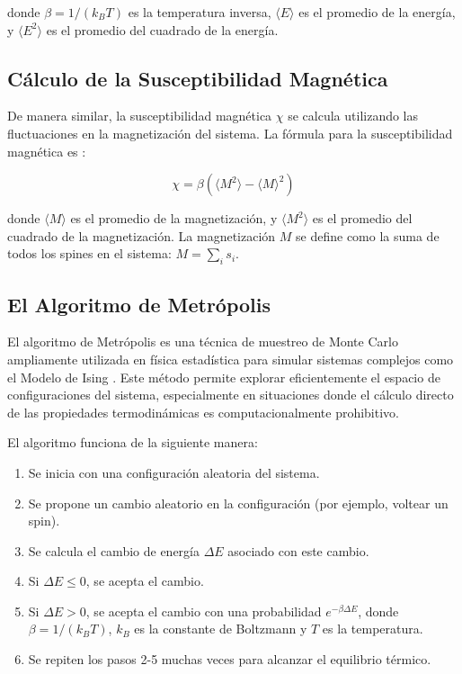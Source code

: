 \documentclass[twocolumn]{article}
\begin{document}
donde $\beta = 1/(k_B T)$ es la temperatura inversa, $\langle E \rangle$ es el promedio de la energía, y $\langle E^2 \rangle$ es el promedio del cuadrado de la energía. 

\subsection*{Cálculo de la Susceptibilidad Magnética}

De manera similar, la susceptibilidad magnética $\chi$ se calcula utilizando las fluctuaciones en la magnetización del sistema. La fórmula para la susceptibilidad magnética es \cite{chang_fisica_computacional}:

\begin{equation}
    \chi = \beta (\langle M^2 \rangle - \langle M \rangle^2)
\end{equation}

donde $\langle M \rangle$ es el promedio de la magnetización, y $\langle M^2 \rangle$ es el promedio del cuadrado de la magnetización. La magnetización $M$ se define como la suma de todos los spines en el sistema: $M = \sum_i s_i$.

\subsection*{El Algoritmo de Metrópolis}

El algoritmo de Metrópolis es una técnica de muestreo de Monte Carlo ampliamente utilizada en física estadística para simular sistemas complejos como el Modelo de Ising \cite{algorithmarchive}. Este método permite explorar eficientemente el espacio de configuraciones del sistema, especialmente en situaciones donde el cálculo directo de las propiedades termodinámicas es computacionalmente prohibitivo.

El algoritmo funciona de la siguiente manera:

\begin{enumerate}
    \item Se inicia con una configuración aleatoria del sistema.
    \item Se propone un cambio aleatorio en la configuración (por ejemplo, voltear un spin).
    \item Se calcula el cambio de energía $\Delta E$ asociado con este cambio.
    \item Si $\Delta E \leq 0$, se acepta el cambio.
    \item Si $\Delta E > 0$, se acepta el cambio con una probabilidad $e^{-\beta \Delta E}$, donde $\beta = 1/(k_B T)$, $k_B$ es la constante de Boltzmann y $T$ es la temperatura.
    \item Se repiten los pasos 2-5 muchas veces para alcanzar el equilibrio térmico.
\end{enumerate}
\end{document}
